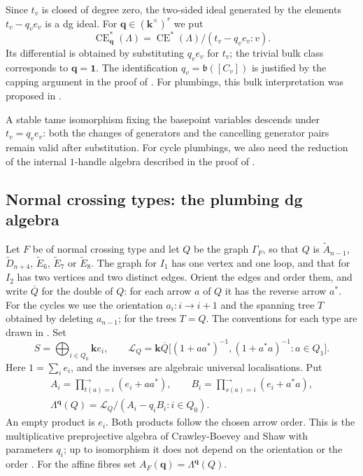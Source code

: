 \documentclass[a4paper]{amsart}
\newcommand{\kk}{\mathbf{k}}
\DeclareMathOperator{\CE}{CE}
\numberwithin{equation}{section}
\begin{document}
Since $t_v$ is closed of degree zero, the two-sided ideal generated by
the elements $t_v-q_ve_v$ is a dg ideal. For
$\boldsymbol q\in(\kk^\times)^r$ we put
\begin{equation}\label{eq:ce-specialisation}
 \CE^*_{\boldsymbol q}(\Lambda)=\CE^*(\Lambda)/(t_v-q_ve_v:v).
\end{equation}
Its differential is obtained by substituting $q_ve_v$ for $t_v$;
the trivial bulk class corresponds to $\boldsymbol q=\boldsymbol1$.
The identification $q_v=\mathfrak b([C_v])$ is justified by the
capping argument in the proof of .
For plumbings, this bulk interpretation was proposed in
\cite[Remark~2]{ELplumbing}.

A stable tame isomorphism fixing the basepoint variables descends under
$t_v=q_ve_v$: both the changes of generators and the cancelling generator
pairs remain valid after substitution. For cycle plumbings, we also
need the reduction of the internal $1$-handle algebra described in the
proof of .

\subsection{Normal crossing types: the plumbing dg algebra}
\label{subsec:plumbing-dga}

Let $F$ be of normal crossing type and let $Q$ be the graph
$\Gamma_F$, so that $Q$ is $\widetilde A_{n-1}$, $\widetilde D_{n+4}$,
$\widetilde E_6$, $\widetilde E_7$ or $\widetilde E_8$. The graph for
$I_1$ has one vertex and one loop, and that for $I_2$ has two vertices
and two distinct edges. Orient the edges and order them, and write
$\overline Q$ for the double of $Q$: for each arrow $a$ of $Q$ it has
the reverse arrow $a^*$. For the cycles we use the orientation
$a_i:i\to i+1$ and the spanning tree $T$ obtained by deleting
$a_{n-1}$; for the trees $T=Q$. The conventions for each type are drawn
in .
Set
\[
 S=\bigoplus_{i\in Q_0}\kk e_i,\qquad
 \mathscr L_Q=\kk\overline Q
 \big[(1+aa^*)^{-1},(1+a^*a)^{-1}:a\in Q_1\big].
\]
Here $1=\sum_i e_i$, and the inverses are algebraic universal
localisations. Put
\begin{equation}\label{eq:vertex-products}
\begin{gathered}
 A_i=\prod_{t(a)=i}^{\longrightarrow}(e_i+aa^*),\qquad
 B_i=\prod_{s(a)=i}^{\longrightarrow}(e_i+a^*a),\\
 \Lambda^{\boldsymbol q}(Q)=\mathscr L_Q/(A_i-q_iB_i:i\in Q_0).
\end{gathered}
\end{equation}
An empty product is $e_i$. Both products follow the chosen arrow order.
This is the multiplicative preprojective algebra of Crawley-Boevey and
Shaw with parameters $q_i$; up to isomorphism it does not depend on the
orientation or the order
\cite[Theorem~1.4]{CBShaw}. For the affine fibres set
$A_F(\boldsymbol q)=\Lambda^{\boldsymbol q}(Q)$.
\end{document}
